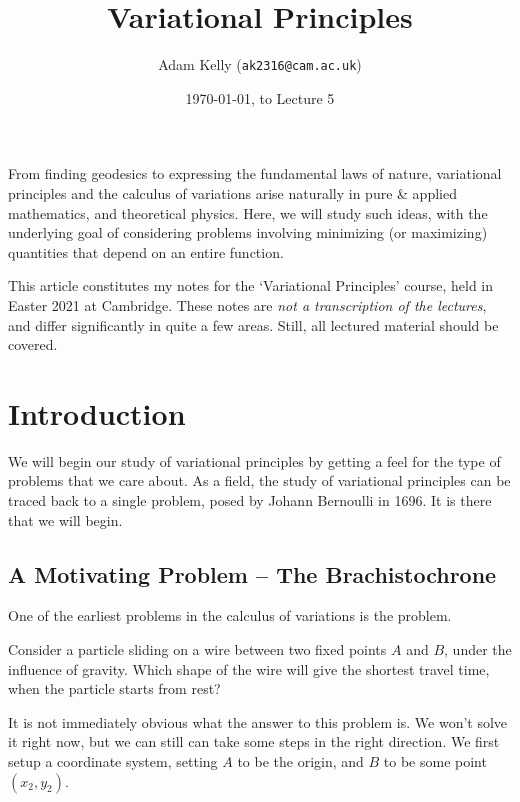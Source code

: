 \documentclass[a4paper]{scrartcl}
\title{Variational Principles}
\author{Adam Kelly (\texttt{ak2316@cam.ac.uk})}
\date{\today, to Lecture 5}
\begin{document}
\maketitle

From finding geodesics to expressing the fundamental laws of nature, variational principles and the calculus of variations arise naturally in pure \& applied mathematics, and theoretical physics.
Here, we will study such ideas, with the underlying goal of considering problems involving minimizing (or maximizing) quantities that depend on an entire function. 

This article constitutes my notes for the `Variational Principles' course, held in Easter 2021 at Cambridge. These notes are \emph{not a transcription of the lectures}, and differ significantly in quite a few areas. Still, all lectured material should be covered.


\tableofcontents

\section{Introduction}



We will begin our study of variational principles by getting a feel for the type of problems that we care about. 
As a field, the study of variational principles can be traced back to a single problem, posed by Johann Bernoulli in 1696. It is there that we will begin.

\subsection{A Motivating Problem -- The Brachistochrone}

One of the earliest problems in the calculus of variations is the  problem.

\begin{example}[Brachistochrone]
	Consider a particle sliding on a wire between two fixed points $A$ and $B$, under the influence of gravity. Which shape of the wire will give the shortest travel time, when the particle starts from rest?
\end{example}

It is not immediately obvious what the answer to this problem is. We won't solve it right now, but we can still can take some steps in the right direction. We first setup a coordinate system, setting $A$ to be the origin, and $B$ to be some point $(x_2, y_2)$.
\end{document}
